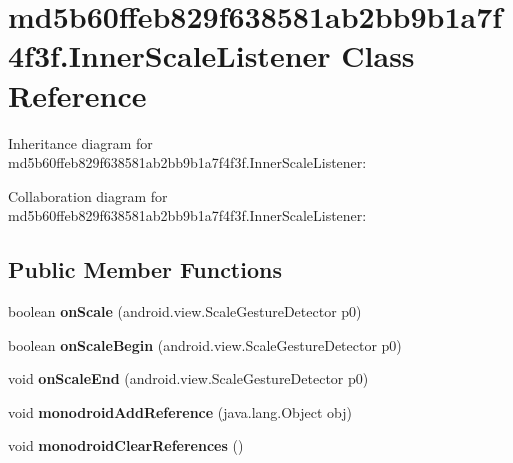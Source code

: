 \hypertarget{classmd5b60ffeb829f638581ab2bb9b1a7f4f3f_1_1_inner_scale_listener}{}\section{md5b60ffeb829f638581ab2bb9b1a7f4f3f.\+Inner\+Scale\+Listener Class Reference}
\label{classmd5b60ffeb829f638581ab2bb9b1a7f4f3f_1_1_inner_scale_listener}


Inheritance diagram for md5b60ffeb829f638581ab2bb9b1a7f4f3f.\+Inner\+Scale\+Listener\+:


Collaboration diagram for md5b60ffeb829f638581ab2bb9b1a7f4f3f.\+Inner\+Scale\+Listener\+:
\subsection*{Public Member Functions}
\begin{DoxyCompactItemize}
\item 
\mbox{\label{classmd5b60ffeb829f638581ab2bb9b1a7f4f3f_1_1_inner_scale_listener_a9541f867e31a3ee001b6454b9dd02067}} 
boolean {\bfseries on\+Scale} (android.\+view.\+Scale\+Gesture\+Detector p0)
\item 
\mbox{\label{classmd5b60ffeb829f638581ab2bb9b1a7f4f3f_1_1_inner_scale_listener_ace0e9a6c5689492acdb304345237b013}} 
boolean {\bfseries on\+Scale\+Begin} (android.\+view.\+Scale\+Gesture\+Detector p0)
\item 
\mbox{\label{classmd5b60ffeb829f638581ab2bb9b1a7f4f3f_1_1_inner_scale_listener_ad1e5c4a080a15064afa8a879af6de198}} 
void {\bfseries on\+Scale\+End} (android.\+view.\+Scale\+Gesture\+Detector p0)
\item 
\mbox{\label{classmd5b60ffeb829f638581ab2bb9b1a7f4f3f_1_1_inner_scale_listener_a376dba1ab8327e4c25355f35bae0a8d7}} 
void {\bfseries monodroid\+Add\+Reference} (java.\+lang.\+Object obj)
\item 
\mbox{\label{classmd5b60ffeb829f638581ab2bb9b1a7f4f3f_1_1_inner_scale_listener_a642366a6c026d7fa42238967fa2abb21}} 
void {\bfseries monodroid\+Clear\+References} ()
\end{DoxyCompactItemize}
